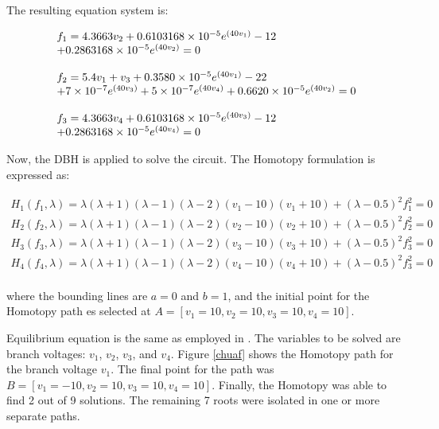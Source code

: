 \documentclass[conference,letterpaper,onecolumn]{IEEEtran}
\begin{document}
{The resulting equation system is:

\begin{displaymath}
{\small
\begin{array}{l}
f_1=4.3663v_2+0.6103168 \times 10^{-5} e^{(40v_1)}-12\\+0.2863168\times 10^{-5}e^{(40v_2)}=0 \\ \\
f_2=5.4v_1+v_3+0.3580\times 10^{-5}e^{(40v_1)}-22\\+7\times 10^{-7}e^{(40v_3)}+  5\times 10^{-7}e^{(40v_4)}+0.6620\times 10^{-5}e^{(40v_2)}=0 \\ \\
f_3=4.3663v_4+0.6103168\times 10^{-5}e^{(40v_3)}-12\\+0.2863168\times 10^{-5}e^{(40v_4)}=0 \\
\end{array}
}
\end{displaymath}

Now, the DBH is applied to solve the circuit. The Homotopy formulation is expressed as:

\begin{displaymath}
\begin{array}{c}
H_1(f_1,\lambda)=\lambda(\lambda+1)(\lambda-1)(\lambda-2)(v_1-10)(v_1+10)+(\lambda-0.5)^2 f_1^2=0\\
H_2(f_2,\lambda)=\lambda(\lambda+1)(\lambda-1)(\lambda-2)(v_2-10)(v_2+10)+(\lambda-0.5)^2 f_2^2=0\\
H_3(f_3,\lambda)=\lambda(\lambda+1)(\lambda-1)(\lambda-2)(v_3-10)(v_3+10)+(\lambda-0.5)^2 f_3^2=0\\
H_4(f_4,\lambda)=\lambda(\lambda+1)(\lambda-1)(\lambda-2)(v_4-10)(v_4+10)+(\lambda-0.5)^2 f_3^2=0\\
\end{array}
\end{displaymath}

where the bounding lines are $a=0$ and $b=1$, and the initial point for the Homotopy path es selected at $A=[v_1=10,v_2=10,v_3=10,v_4=10]$.

Equilibrium equation is the same as employed in \cite{homo_chua}. The variables to be solved are branch voltages: $v_1$, $v_2$, $v_3$, and $v_4$. Figure \ref{chuaf} shows the Homotopy path for the branch voltage $v_1$. The final point for the path was $B=[v_1=-10,v_2=10,v_3=10,v_4=10]$. Finally, the Homotopy was able to find 2 out of 9 solutions. The remaining 7 roots were isolated in one or more separate paths.

}
\end{document}
